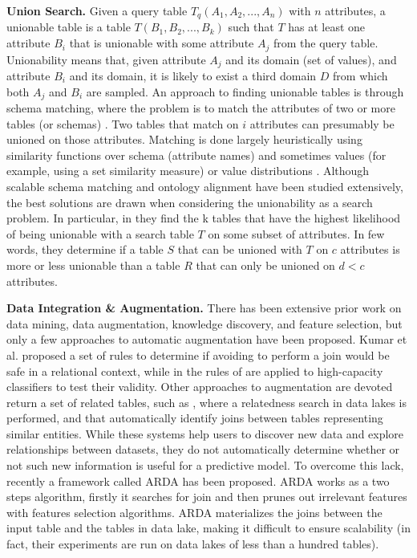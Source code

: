 \textbf{Union Search.} Given a query table $T_q(A_1,A_2,...,A_n)$ with $n$ attributes, a unionable table is a table $T(B_1, B_2,...,B_k)$ such that $T$ has at least one attribute $B_i$ that is unionable with some attribute $A_j$ from the query table. Unionability means that, given attribute $A_j$ and its domain (set of values), and attribute $B_i$ and its domain, it is likely to exist a third domain $D$ from which both $A_j$ and $B_i$ are sampled. An approach to finding unionable tables is through schema matching, where the problem is to match the attributes of two or more tables (or schemas) \cite{he2003statistical,rahm2011towards}. Two tables that match on $i$ attributes can presumably be unioned on those attributes. Matching is done largely heuristically using similarity functions over schema (attribute names) and sometimes values (for example, using a set similarity measure) or value distributions \cite{kang2003schema}. Although scalable schema matching and ontology alignment have been studied extensively, the best solutions are drawn when considering the unionability as a search problem. In particular, in \cite{nargesian2018table} they find the k tables that have the highest likelihood of being unionable with a search table $T$ on some subset of attributes. In few words, they determine if a table $S$ that can be unioned with $T$ on $c$ attributes is more or less unionable than a table $R$ that can only be unioned on $d < c$ attributes.


\textbf{Data Integration \& Augmentation.} There has been extensive prior work on data mining, data augmentation, knowledge discovery, and feature selection, but only a few approaches to automatic augmentation have been proposed. Kumar et al. \cite{kumar2016join} proposed a set of rules to determine if avoiding to perform a join would be safe in a relational context, while in \cite{shah2017key} the rules of \cite{kumar2016join} are applied to high-capacity classifiers to test their validity. Other approaches to augmentation are devoted return a set of related tables, such as \cite{bogatu2020dataset}, where a relatedness search in data lakes is performed, and \cite{fernandez2018aurum} that automatically identify joins between tables representing similar entities. While these systems help users to discover new data and explore relationships between datasets, they do not automatically determine whether or not such new information
is useful for a predictive model. To overcome this lack, recently a framework called ARDA \cite{chepurko2020arda} has been proposed. ARDA works as a two steps algorithm, firstly it searches for join and then prunes out irrelevant features with features selection algorithms. ARDA materializes the joins between the input table and the tables in data lake, making it difficult to ensure scalability (in fact, their experiments are run on data lakes of less than a hundred tables).

